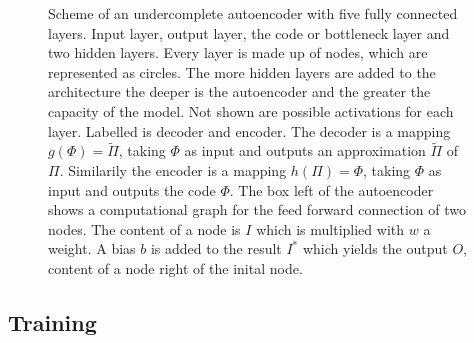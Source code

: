 \begin{figure}
	\centering
	
	\caption{\footnotesize Scheme of an undercomplete autoencoder with five fully connected layers. Input layer, output layer, the code or bottleneck layer and two hidden layers. Every layer is made up of nodes, which are represented as circles. The more hidden layers are added to the architecture the deeper is the autoencoder and the greater the capacity of the model. Not shown are possible activations for each layer. Labelled is decoder and encoder. The decoder is a mapping \(g(\Phi)=\tilde{\Pi}\), taking \(\Phi\) as input and outputs an approximation \(\tilde{\Pi}\) of \(\Pi\). Similarily the encoder is a mapping \(h(\Pi)=\Phi\), taking \(\Phi\) as input and outputs the code \(\Phi\). The box left of the autoencoder shows a computational graph for the feed forward connection of two nodes. The content of a node is \(I\) which is multiplied with \(w\) a weight. A bias \(b\) is added to the result \(I^*\) which yields the output \(O\), content of a node right of the inital node.}
	\label{Fig:Autoencoder}
\end{figure}
\subsection{Training}

